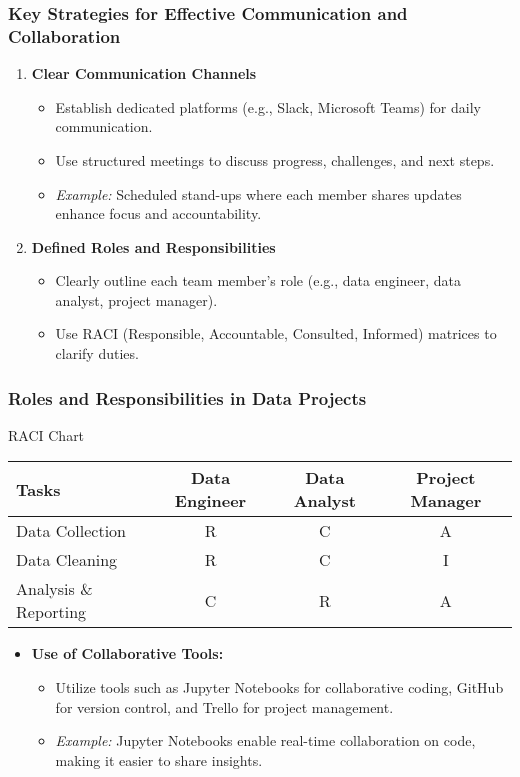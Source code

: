 \documentclass[aspectratio=169]{beamer}
\begin{document}
\begin{frame}[fragile]
    \frametitle{Key Strategies for Effective Communication and Collaboration}
    \begin{enumerate}
        \item \textbf{Clear Communication Channels}
        \begin{itemize}
            \item Establish dedicated platforms (e.g., Slack, Microsoft Teams) for daily communication.
            \item Use structured meetings to discuss progress, challenges, and next steps.
            \item \textit{Example:} Scheduled stand-ups where each member shares updates enhance focus and accountability.
        \end{itemize}
        
        \item \textbf{Defined Roles and Responsibilities}
        \begin{itemize}
            \item Clearly outline each team member's role (e.g., data engineer, data analyst, project manager).
            \item Use RACI (Responsible, Accountable, Consulted, Informed) matrices to clarify duties.
        \end{itemize}
    \end{enumerate}
\end{frame}

\begin{frame}[fragile]
    \frametitle{Roles and Responsibilities in Data Projects}
    \begin{block}{RACI Chart}
        \begin{tabular}{|l|c|c|c|}
            \hline
            Tasks                 & Data Engineer & Data Analyst & Project Manager \\
            \hline
            Data Collection       & R             & C            & A                \\
            Data Cleaning         & R             & C            & I                \\
            Analysis \& Reporting  & C             & R            & A                \\
            \hline
        \end{tabular}
    \end{block}

    \begin{itemize}
        \item \textbf{Use of Collaborative Tools:}
        \begin{itemize}
            \item Utilize tools such as Jupyter Notebooks for collaborative coding, GitHub for version control, and Trello for project management.
            \item \textit{Example:} Jupyter Notebooks enable real-time collaboration on code, making it easier to share insights.
        \end{itemize}
    \end{itemize}
\end{frame}
\end{document}
